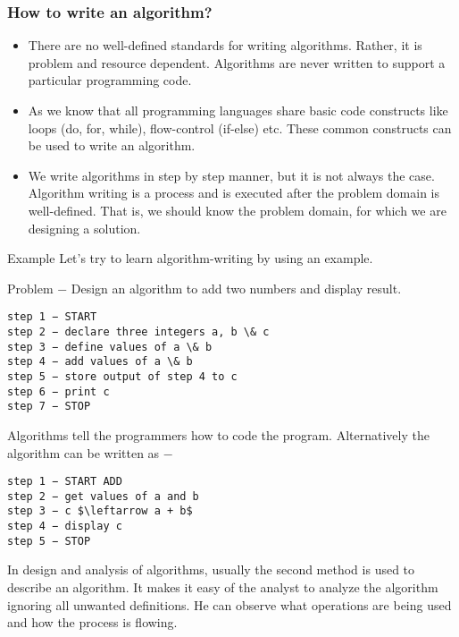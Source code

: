 \documentclass{beamer}
\begin{document}


\begin{frame}
\frametitle{How to write an algorithm?}
\begin{itemize}
	\item There are no well-defined standards for writing algorithms. Rather, it is problem and resource dependent. Algorithms are never written to support a particular programming code.
	
\item As we know that all programming languages share basic code constructs like loops (do, for, while), flow-control (if-else) etc. These common constructs can be used to write an algorithm.
	
\item We write algorithms in step by step manner, but it is not always the case. Algorithm writing is a process and is executed after the problem domain is well-defined. That is, we should know the problem domain, for which we are designing a solution.
\end{itemize}

\end{frame}
\begin{frame}[fragile]
Example
Let's try to learn algorithm-writing by using an example.

Problem − Design an algorithm to add two numbers and display result.
\begin{verbatim}
step 1 − START
step 2 − declare three integers a, b \& c
step 3 − define values of a \& b
step 4 − add values of a \& b
step 5 − store output of step 4 to c
step 6 − print c
step 7 − STOP
\end{verbatim}

\end{frame}
\begin{frame}[fragile]
Algorithms tell the programmers how to code the program. Alternatively the algorithm can be written as −
\begin{verbatim}
step 1 − START ADD
step 2 − get values of a and b
step 3 − c $\leftarrow a + b$
step 4 − display c
step 5 − STOP
\end{verbatim}
\end{frame}
\begin{frame}
In design and analysis of algorithms, usually the second method is used to describe an algorithm. It makes it easy of the analyst to analyze the algorithm ignoring all unwanted definitions. He can observe what operations are being used and how the process is flowing.
\end{frame}
\end{document}

